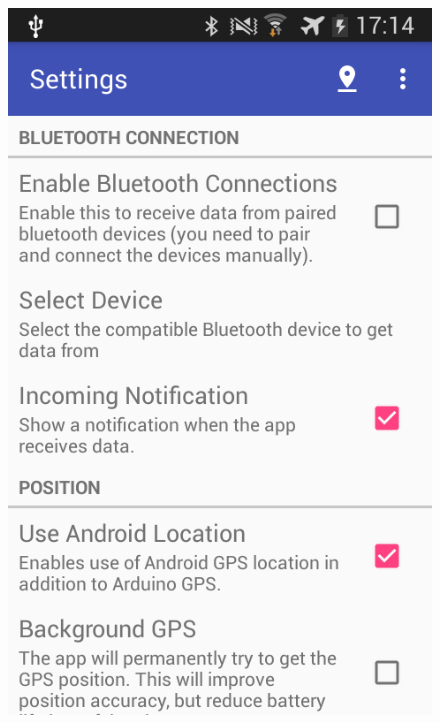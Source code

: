\begin{figure}
\centering
\begin{minipage}{.5\textwidth}
  \centering
  \includegraphics[width=.8\linewidth]{src/settings_en_1.png}
\end{minipage}%
\begin{minipage}{.5\textwidth}
  \centering

\end{minipage}
\end{figure}
